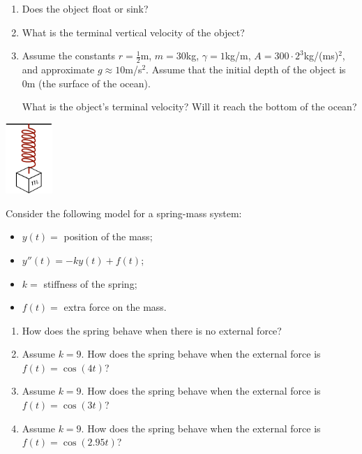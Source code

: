 \begin{exercises}
\begin{problist}
	\begin{enumerate}
		\item Does the object float or sink? 
		\item What is the terminal vertical velocity of the object?
		\item Assume the constants $r=\frac12$m, $m=30$kg, $\gamma =1$kg/m, $A=300 \cdot 2^3$kg/(ms)$^2$, and approximate $g\approx 10$m/s$^2$. Assume that the initial depth of the object is 0m (the surface of the ocean). 
			
			What is the object's terminal velocity?
			Will it reach the bottom of the ocean?
	\end{enumerate}
	
	
	\begin{center}
		\includegraphics*[width=50pt]{images/module22-spring-mass.pdf}
	\end{center}

	
	\prob Consider the following model for a spring-mass system:
	\begin{itemize}
		\item $y(t) = $ position of the mass;
		\item $y''(t)  = -ky(t) + f(t)$;
		\item $k=$ stiffness of the spring;
		\item $f(t)=$ extra force on the mass.
	\end{itemize}

	\begin{enumerate}
		\item How does the spring behave when there is no external force?
		\item Assume $k=9$. How does the spring behave when the external force is $f(t)=\cos(4t)$?
		\item Assume $k=9$. How does the spring behave when the external force is $f(t)=\cos(3t)$?
		\item Assume $k=9$. How does the spring behave when the external force is $f(t)=\cos(2.95t)$?
	\end{enumerate}
		
	\end{problist}
\end{exercises}